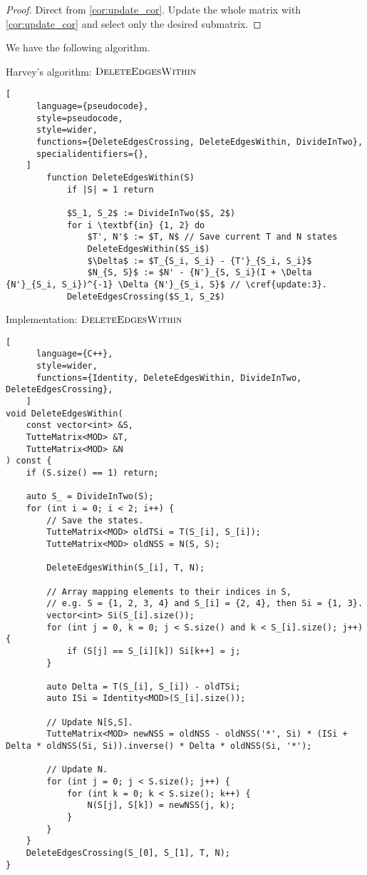 \begin{proof}
    Direct from \cref{cor:update_cor}. Update the whole matrix with \ref{cor:update_cor} and select only the desired submatrix.
\end{proof}

We have the following algorithm.

\begin{programruledcaption}{Harvey's algorithm: \(\textsc{DeleteEdgesWithin}\)}
    \begin{lstlisting}[
      language={pseudocode},
      style=pseudocode,
      style=wider,
      functions={DeleteEdgesCrossing, DeleteEdgesWithin, DivideInTwo},
      specialidentifiers={},
    ]
        function DeleteEdgesWithin(S)
            if |S| = 1 return

            $S_1, S_2$ := DivideInTwo($S, 2$)
            for i \textbf{in} {1, 2} do
                $T', N'$ := $T, N$ // Save current T and N states
                DeleteEdgesWithin($S_i$)
                $\Delta$ := $T_{S_i, S_i} - {T'}_{S_i, S_i}$
                $N_{S, S}$ := $N' - {N'}_{S, S_i}(I + \Delta {N'}_{S_i, S_i})^{-1} \Delta {N'}_{S_i, S}$ // \cref{update:3}. 
            DeleteEdgesCrossing($S_1, S_2$)
    \end{lstlisting}
\end{programruledcaption}

\begin{programruledcaption}{Implementation: \(\textsc{DeleteEdgesWithin}\)}
    \begin{lstlisting}[
      language={C++},
      style=wider,
      functions={Identity, DeleteEdgesWithin, DivideInTwo, DeleteEdgesCrossing},
    ]
void DeleteEdgesWithin(
    const vector<int> &S, 
    TutteMatrix<MOD> &T, 
    TutteMatrix<MOD> &N
) const {
    if (S.size() == 1) return;

    auto S_ = DivideInTwo(S);
    for (int i = 0; i < 2; i++) {
        // Save the states.
        TutteMatrix<MOD> oldTSi = T(S_[i], S_[i]);
        TutteMatrix<MOD> oldNSS = N(S, S);

        DeleteEdgesWithin(S_[i], T, N);

        // Array mapping elements to their indices in S,
        // e.g. S = {1, 2, 3, 4} and S_[i] = {2, 4}, then Si = {1, 3}.
        vector<int> Si(S_[i].size());
        for (int j = 0, k = 0; j < S.size() and k < S_[i].size(); j++) {
            if (S[j] == S_[i][k]) Si[k++] = j;
        }

        auto Delta = T(S_[i], S_[i]) - oldTSi;
        auto ISi = Identity<MOD>(S_[i].size());

        // Update N[S,S].
        TutteMatrix<MOD> newNSS = oldNSS - oldNSS('*', Si) * (ISi + Delta * oldNSS(Si, Si)).inverse() * Delta * oldNSS(Si, '*');

        // Update N.
        for (int j = 0; j < S.size(); j++) {
            for (int k = 0; k < S.size(); k++) {
                N(S[j], S[k]) = newNSS(j, k);
            }
        }
    }
    DeleteEdgesCrossing(S_[0], S_[1], T, N);
}
    \end{lstlisting}
\end{programruledcaption}

